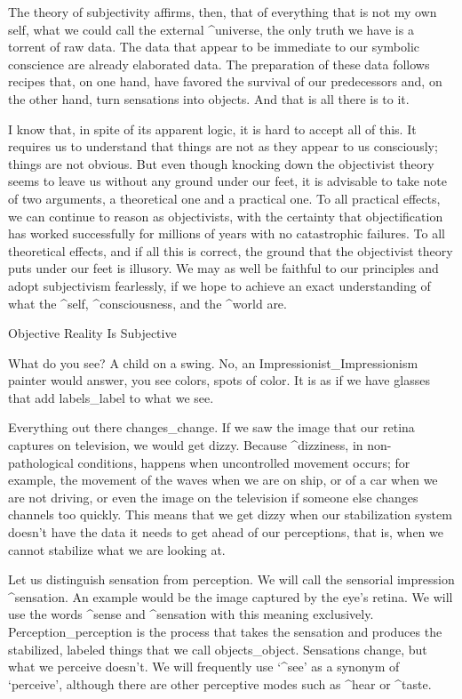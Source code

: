 The theory of subjectivity affirms, then, that of everything that is not
my own self, what we could call the external ^{universe}, the only truth
we have is a torrent of raw data. The data that appear to be immediate
to our symbolic conscience are already elaborated data. The preparation
of these data follows recipes that, on one hand, have favored the
survival of our predecessors and, on the other hand, turn sensations
into objects. And that is all there is to it.

I know that, in spite of its apparent logic, it is hard to accept all of
this. It requires us to understand that things are not as they appear to
us consciously; things are not obvious. But even though knocking down
the objectivist theory seems to leave us without any ground under our
feet, it is advisable to take note of  two arguments, a theoretical one
and a practical one. To all practical effects, we can continue to reason
as objectivists, with the certainty that objectification has worked
successfully for millions of years with no catastrophic failures. To all
theoretical effects, and if all this is correct, the ground that the
objectivist theory puts under our feet is illusory. We may as well be
faithful to our principles and adopt subjectivism fearlessly, if we hope
to achieve an exact understanding of what the ^{self}, ^{consciousness},
and the ^{world} are.


\Section Objective Reality Is Subjective

What do you see?  A child on a swing. No, an
Impressionist_{Impressionism} painter would answer, you see colors,
spots of color. It is as if we have glasses that add labels_{label} to
what we see. %

Everything out there changes_{change}. If we saw the image that our
retina captures on television, we would get dizzy. Because ^{dizziness},
in non-pathological conditions, happens when uncontrolled movement
occurs; for example, the movement of the waves when we are on ship, or
of a car when we are not driving, or even the image on the television if
someone else changes channels too quickly. This means that we get dizzy
when our stabilization system doesn't have the data it needs to get
ahead of our perceptions, that is, when we cannot stabilize what we are
looking at.

Let us distinguish sensation from perception. We will call the sensorial
impression ^{sensation}. An example would be the image captured by the
eye's retina. We will use the words ^{sense} and ^{sensation} with this
meaning exclusively. Perception_{perception} is the process that takes
the sensation and produces the stabilized, labeled things that we call
objects_{object}. Sensations change, but what we perceive doesn't. We
will frequently use `^{see}' as a synonym of `perceive', although there
are other perceptive modes such as ^{hear} or ^{taste}.

